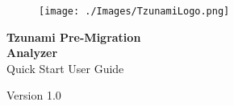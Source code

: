 \pagestyle{empty}
\begin{figure}[tp] %
\texttt{[image: ./Images/TzunamiLogo.png]}
\end{figure}
\begin{flushright}  
	\vspace*{\fill}
	 \textcolor{coverTextColor}{\huge \textbf{Tzunami Pre-Migration}}\\
	 \textcolor{coverTextColor}{\huge \textbf{{Analyzer}\\}}  
	Quick Start User Guide
	\vspace*{\fill}
\par

\end{flushright}
\begin{center} 
{\Large\vspace*{2mm} \par\vspace*{4mm} \vspace*{3mm}\large Version 1.0}\par %
\end{center} 
 